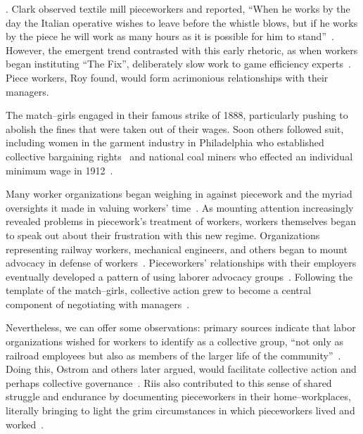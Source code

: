 \documentclass[pn4226]{subfiles}
\begin{document}
.
Clark observed textile mill pieceworkers and reported,
``When he works by the day the Italian operative wishes to leave before the whistle blows,
but if he works by the piece he will work as many hours as it is possible for him to stand''~\cite{clark1908cotton}.
However, the emergent trend contrasted with this early rhetoric, as
when workers began instituting ``The Fix'', deliberately slow work to game efficiency experts~\cite{roy1954efficiency}.
Piece workers, Roy found, would form acrimonious relationships with their managers.

The match--girls engaged in their famous strike of 1888, particularly pushing to abolish the fines that were taken out of their wages.
Soon others followed suit, including women in the garment industry in Philadelphia who established collective bargaining rights~\cite{10.2307/41829256} and national coal miners who effected an individual minimum wage in 1912~\cite{10.2307/2221944}.


Many worker organizations began weighing in against
piecework and the myriad oversights it made in valuing workers' time~\cite{american1921problem,richards1904anything}.
As mounting attention increasingly revealed problems in piecework's treatment of workers,
workers themselves began to speak out about their frustration with this new regime.
Organizations representing
railway workers,
mechanical engineers, and
others began to mount advocacy in defense of workers~\cite{american1921problem,richards1904anything}.
Pieceworkers' relationships with their employers eventually developed a pattern of using 
laborer advocacy groups~\cite{levi2009union,ahlquist2013interest,mccallum2013global,jacoby1983union}.
Following the template of the match--girls, collective action grew to become a central component of negotiating with managers~\cite{russell1982collective,olsonlogic}.

Nevertheless, we can offer some observations:
primary sources indicate that labor organizations wished for workers to identify as a collective group, 
``not only as railroad employees but also as members of the larger life of the community''~\cite{american1921problem}.
Doing this, 
Ostrom and others later argued,
would facilitate collective action and perhaps collective governance~\cite{ostrom1990governing,russell1982collective,olsonlogic}.
Riis also contributed to this sense of shared struggle and endurance
by documenting pieceworkers in their home--workplaces,
literally bringing to light the grim circumstances in which pieceworkers lived and worked~\cite{riisOtherSideLives}.
\end{document}
